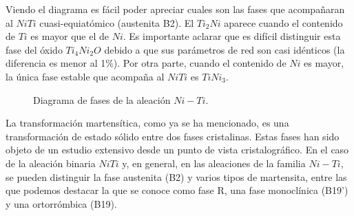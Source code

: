 \documentclass[12pt]{article}
\theoremstyle{definition}
\theoremstyle{remark}
\begin{document}
Viendo el diagrama es fácil poder apreciar cuales son las fases que acompañaran al $NiTi$ cuasi-equiatómico (austenita B2). El $Ti_2Ni$ aparece cuando el contenido de $Ti$ es mayor que el de $Ni$. Es importante aclarar que es difícil distinguir esta fase del óxido $Ti_4Ni_2O$ debido a que sus parámetros de red son casi idénticos (la diferencia es menor al 1\%). Por otra parte, cuando el contenido de $Ni$ es mayor, la única fase estable que acompaña al $NiTi$ es $TiNi_3$.

\begin{figure}[H]
	\centering
	\caption{Diagrama de fases de la aleación $Ni-Ti$.}
	\label{PhaseDiagram}
\end{figure}

La transformación martensítica, como ya se ha mencionado, es una transformación de estado sólido entre dos fases cristalinas. Estas fases han sido objeto de un estudio extensivo desde un punto de vista cristalográfico. En el caso de la aleación binaria $NiTi$ y, en general, en las aleaciones de la familia $Ni-Ti$, se pueden distinguir la fase austenita (B2) y varios tipos de martensita, entre las que podemos destacar la que se conoce como fase R, una fase monoclínica (B19’) y una ortorrómbica (B19).
\end{document}

